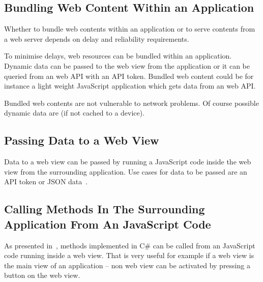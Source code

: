 \documentclass[conference]{IEEEtran}
\begin{document}
\subsection{Bundling Web Content Within an Application}

Whether to bundle web contents within an application or to serve contents from a web server depends on delay and reliability requirements.

To minimise delays, web resources can be bundled within an application. Dynamic data can be passed to the web view from the application or it can be queried from an web API with an API token. Bundled web content could be for instance a light weight JavaScript application which gets data from an web API.

Bundled web contents are not vulnerable to network problems. Of course possible dynamic data are (if not cached to a device).

\subsection{Passing Data to a Web View}

Data to a web view can be passed by running a JavaScript code inside the web view from the surrounding application. Use cases for data to be passed are an API token or JSON data~\cite{json}.

\subsection{Calling Methods In The Surrounding Application From An JavaScript Code}

As presented in~\cite{hwb}, methods implemented in C# can be called from an JavaScript code running inside a web view. That is very useful for example if a web view is the main view of an application -- non web view can be activated by pressing a button on the web view.

\nocite{xamarin}
\nocite{xamarin2}
\nocite{xamarin3}


\end{document}
